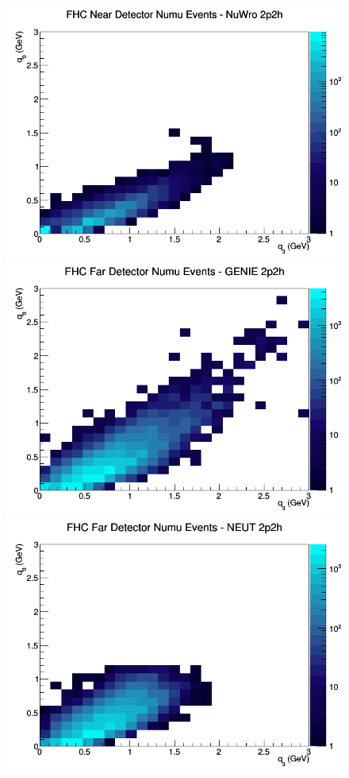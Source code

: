 \documentclass[12pt]{article}
\begin{document}
\begin{figure}[h]
\includegraphics[width=\linewidth]{eff_q0_q3/FGT/2p2h_FHC_ND_numu_q3_q0_NuWro.png}
\endminipage
\newline
{}
\includegraphics[width=\linewidth]{eff_q0_q3/FGT/2p2h_FHC_FD_numu_q3_q0_GENIE.png}
\endminipage
{}
\includegraphics[width=\linewidth]{eff_q0_q3/FGT/2p2h_FHC_FD_numu_q3_q0_NEUT.png}

\end{figure}
\end{document}

